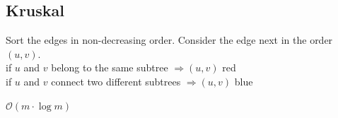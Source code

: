 \subsection{Kruskal}

Sort the edges in non-decreasing order. Consider the edge next in the order $(u,v)$. \\
if $u$ and $v$ belong to the same subtree $\Rightarrow (u,v)$ red \\
if $u$ and $v$ connect two different subtrees $\Rightarrow (u,v)$ blue

$\mathcal{O}(m \cdot \log m)$